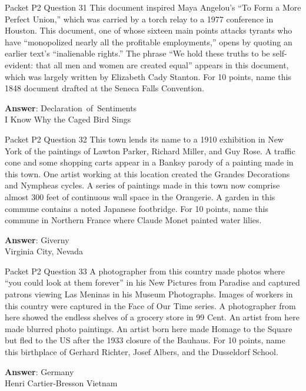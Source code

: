 \begin{frame}{Packet P2 Question 31}
This document inspired Maya Angelou's ``To   Form a More Perfect Union,'' which was carried by a torch relay to a 1977 conference in Houston. This document, one of whose sixteen main points attacks tyrants who have ``monopolized nearly all the profitable employments,''     opens by quoting an earlier text’s “inalienable rights.” The phrase ``We hold these truths to be self-evident:   that all men and women are created equal'' appears in this document, which was largely written by Elizabeth Cady Stanton. For 10 points, name this 1848 document drafted   at the Seneca Falls Convention.

\textbf{Answer}: Declaration\ of\ Sentiments\\
 I Know Why the Caged Bird Sings
\end{frame}

\begin{frame}{Packet P2 Question 32}
This town lends its name to a 1910 exhibition in New York of the paintings of Lawton Parker, Richard Miller, and Guy Rose.   A traffic cone and some shopping carts appear in a Banksy parody of a painting made in this town. One artist working at this location created the Grandes Decorations and Nympheas cycles. A series of paintings made in this town now comprise   almost 300 feet of continuous wall space in the Orangerie. A garden in this commune contains a noted Japanese footbridge. For 10 points, name   this commune in Northern France where Claude Monet painted   water lilies.

\textbf{Answer}: Giverny\\
 Virginia City, Nevada
\end{frame}

\begin{frame}{Packet P2 Question 33}
A photographer from this   country made photos   where ``you could look at them forever'' in his New Pictures from Paradise and captured patrons viewing Las Meninas in his Museum Photographs. Images of workers   in this country were captured in the Face   of Our Time series. A photographer from here showed the endless shelves of a grocery store in 99 Cent. An artist from here made blurred photo paintings. An artist born here made Homage to the Square but fled to the US after the 1933 closure of the Bauhaus. For 10 points, name this birthplace of Gerhard Richter, Josef   Albers, and the Dusseldorf School.

\textbf{Answer}: Germany\\
 Henri Cartier-Bresson
 Vietnam
\end{frame}

